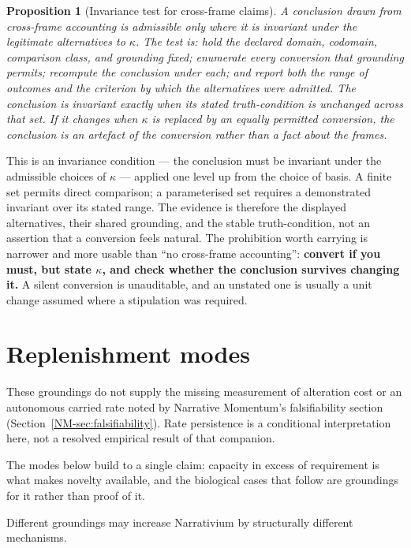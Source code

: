 \documentclass[11pt,a4paper]{article}
\newtheorem{proposition}[definition]{Proposition}
\theoremstyle{remark}
\begin{document}
\begin{proposition}[Invariance test for cross-frame claims]\label{prop:kappa-invariance}
A conclusion drawn from cross-frame accounting is admissible only where it is invariant under the legitimate alternatives to $\kappa$. The test is: hold the declared domain, codomain, comparison class, and grounding fixed; enumerate every conversion that grounding permits; recompute the conclusion under each; and report both the range of outcomes and the criterion by which the alternatives were admitted. The conclusion is invariant exactly when its stated truth-condition is unchanged across that set. If it changes when $\kappa$ is replaced by an equally permitted conversion, the conclusion is an artefact of the conversion rather than a fact about the frames.
\end{proposition}

This is an invariance condition --- the conclusion must be invariant under the admissible choices of $\kappa$ --- applied one level up from the choice of basis. A finite set permits direct comparison; a parameterised set requires a demonstrated invariant over its stated range. The evidence is therefore the displayed alternatives, their shared grounding, and the stable truth-condition, not an assertion that a conversion feels natural. The prohibition worth carrying is narrower and more usable than ``no cross-frame accounting'': \textbf{convert if you must, but state $\kappa$, and check whether the conclusion survives changing it.} A silent conversion is unauditable, and an unstated one is usually a unit change assumed where a stipulation was required.

\section{Replenishment modes}\label{sec:replenishment}
These groundings do not supply the missing measurement of alteration cost or
an autonomous carried rate noted by Narrative Momentum's falsifiability section
(Section~\ref{NM-sec:falsifiability}). Rate persistence is a conditional
interpretation here, not a resolved empirical result of that companion.


The modes below build to a single claim: capacity in excess of requirement is what makes novelty
available, and the biological cases that follow are groundings for it rather than proof of it.

Different groundings may increase Narrativium by structurally different mechanisms.
\end{document}
